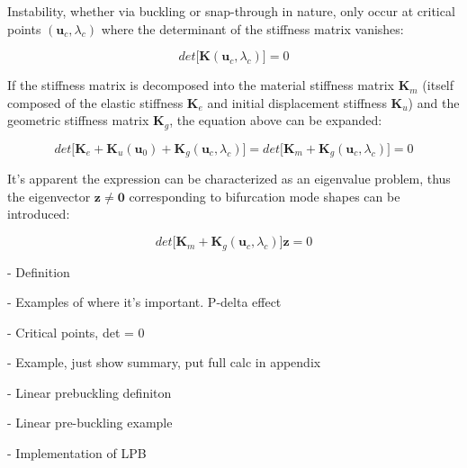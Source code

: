 Instability, whether via buckling or snap-through in nature, only occur at critical points $(\mathbf{u}_c,\lambda_c)$ where the determinant of the stiffness matrix vanishes:

\begin{equation} 
det\big[\mathbf{K}(\mathbf{u}_c,\lambda_c)\big] = 0
\label{eqstab1}
\end{equation}

If the stiffness matrix is decomposed into the material stiffness matrix $\mathbf{K}_m$ (itself composed of the elastic stiffness $\mathbf{K}_e$ and initial displacement stiffness $\mathbf{K}_u$) and the geometric stiffness matrix $\mathbf{K}_g$, the equation above can be expanded:

\begin{equation} 
det\big[
\mathbf{K}_e +
\mathbf{K}_u(\mathbf{u}_0) +
\mathbf{K}_g(\mathbf{u}_c,\lambda_c)
\big] = 
det\big[
\mathbf{K}_m +
\mathbf{K}_g(\mathbf{u}_c,\lambda_c)
\big] = 0
\label{eqstab2}
\end{equation}

It's apparent the expression can be characterized as an eigenvalue problem, thus the eigenvector $\mathbf{z} \neq \mathbf{0}$ corresponding to bifurcation mode shapes can be introduced:

\begin{equation} 
det\big[
\mathbf{K}_m +
\mathbf{K}_g(\mathbf{u}_c,\lambda_c)
\big]\mathbf{z} = 0
\label{eqstab3}
\end{equation}

- Definition

- Examples of where it's important. P-delta effect

- Critical points, det = 0

- Example, just show summary, put full calc in appendix

- Linear prebuckling definiton

- Linear pre-buckling example

- Implementation of LPB